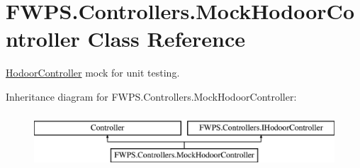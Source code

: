 \hypertarget{class_f_w_p_s_1_1_controllers_1_1_mock_hodoor_controller}{}\section{F\+W\+P\+S.\+Controllers.\+Mock\+Hodoor\+Controller Class Reference}
\label{class_f_w_p_s_1_1_controllers_1_1_mock_hodoor_controller}


\mbox{\hyperlink{class_f_w_p_s_1_1_controllers_1_1_hodoor_controller}{Hodoor\+Controller}} mock for unit testing.  


Inheritance diagram for F\+W\+P\+S.\+Controllers.\+Mock\+Hodoor\+Controller\+:\begin{figure}[H]
\begin{center}
\leavevmode
\includegraphics[height=2.000000cm]{class_f_w_p_s_1_1_controllers_1_1_mock_hodoor_controller}
\end{center}
\end{figure}
